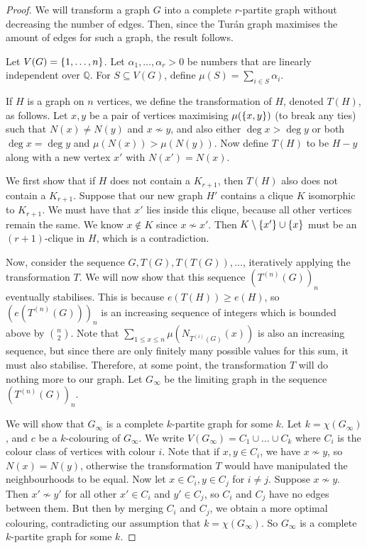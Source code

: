 \begin{proof}
	We will transform a graph \( G \) into a complete \( r \)-partite graph without decreasing the number of edges.
	Then, since the Tur\'an graph maximises the amount of edges for such a graph, the result follows.

	Let \( V(G) = \qty{1, \dots, n} \).
	Let \( \alpha_1, \dots, \alpha_r > 0 \) be numbers that are linearly independent over \( \mathbb Q \).
	For \( S \subseteq V(G) \), define \( \mu(S) = \sum_{i \in S} \alpha_i \).

	If \( H \) is a graph on \( n \) vertices, we define the transformation of \( H \), denoted \( T(H) \), as follows.
	Let \( x, y \) be a pair of vertices maximising \( \mu(\qty{x,y}) \) (to break any ties) such that \( N(x) \neq N(y) \) and \( x \not\sim y \), and also either \( \deg x > \deg y \) or both \( \deg x = \deg y \) and \( \mu(N(x)) > \mu(N(y)) \).
	Now define \( T(H) \) to be \( H - y \) along with a new vertex \( x' \) with \( N(x') = N(x) \).

	We first show that if \( H \) does not contain a \( K_{r+1} \), then \( T(H) \) also does not contain a \( K_{r+1} \).
	Suppose that our new graph \( H' \) contains a clique \( K \) isomorphic to \( K_{r+1} \).
	We must have that \( x' \) lies inside this clique, because all other vertices remain the same.
	We know \( x \not\in K \) since \( x\not\sim x' \).
	Then \( K \setminus \qty{x'} \cup \qty{x} \) must be an \( (r+1) \)-clique in \( H \), which is a contradiction.

	Now, consider the sequence \( G, T(G), T(T(G)), \dots \), iteratively applying the transformation \( T \).
	We will now show that this sequence \( (T^{(n)}(G))_n \) eventually stabilises.
	This is because \( e(T(H)) \geq e(H) \), so \( (e(T^{(n)}(G)))_n \) is an increasing sequence of integers which is bounded above by \( \binom n 2 \).
	Note that \( \sum_{1 \leq x \leq n} \mu(N_{T^{(i)}(G)}(x)) \) is also an increasing sequence, but since there are only finitely many possible values for this sum, it must also stabilise.
	Therefore, at some point, the transformation \( T \) will do nothing more to our graph.
	Let \( G_\infty \) be the limiting graph in the sequence \( (T^{(n)}(G))_n \).

	We will show that \( G_\infty \) is a complete \( k \)-partite graph for some \( k \).
	Let \( k = \chi(G_\infty) \), and \( c \) be a \( k \)-colouring of \( G_\infty \).
	We write \( V(G_\infty) = C_1 \cup \dots \cup C_k \) where \( C_i \) is the colour class of vertices with colour \( i \).
	Note that if \( x, y \in C_i \), we have \( x \not\sim y \), so \( N(x) = N(y) \), otherwise the transformation \( T \) would have manipulated the neighbourhoods to be equal.
	Now let \( x \in C_i, y \in C_j \) for \( i \neq j \).
	Suppose \( x \not\sim y \).
	Then \( x' \not\sim y' \) for all other \( x' \in C_i \) and \( y' \in C_j \), so \( C_i \) and \( C_j \) have no edges between them.
	But then by merging \( C_i \) and \( C_j \), we obtain a more optimal colouring, contradicting our assumption that \( k = \chi(G_\infty) \).
	So \( G_\infty \) is a complete \( k \)-partite graph for some \( k \).


\end{proof}
